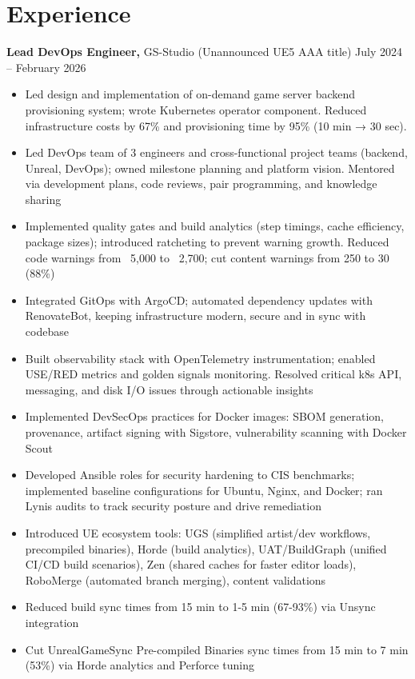 \documentclass[10.5pt]{article}
\begin{document}
\section*{Experience}
\textbf{Lead DevOps Engineer,} GS-Studio (Unannounced UE5 AAA title) \hfill July 2024 -- February 2026 \\
\vspace{-8pt}
\begin{itemize}
  \item Led design and implementation of on-demand game server backend provisioning system; wrote Kubernetes operator component. Reduced infrastructure costs by 67\% and provisioning time by 95\% (10 min → 30 sec).
  \item Led DevOps team of 3 engineers and cross-functional project teams (backend, Unreal, DevOps); owned milestone planning and platform vision. Mentored via development plans, code reviews, pair programming, and knowledge sharing
  \item Implemented quality gates and build analytics (step timings, cache efficiency, package sizes); introduced ratcheting to prevent warning growth. Reduced code warnings from ~5,000 to ~2,700; cut content warnings from 250 to 30 (88\%)
  \item Integrated GitOps with ArgoCD; automated dependency updates with RenovateBot, keeping infrastructure modern, secure and in sync with codebase
  \item Built observability stack with OpenTelemetry instrumentation; enabled USE/RED metrics and golden signals monitoring. Resolved critical k8s API, messaging, and disk I/O issues through actionable insights
  \item Implemented DevSecOps practices for Docker images: SBOM generation, provenance, artifact signing with Sigstore, vulnerability scanning with Docker Scout
  \item Developed Ansible roles for security hardening to CIS benchmarks; implemented baseline configurations for Ubuntu, Nginx, and Docker; ran Lynis audits to track security posture and drive remediation
  \item Introduced UE ecosystem tools: UGS (simplified artist/dev workflows, precompiled binaries), Horde (build analytics), UAT/BuildGraph (unified CI/CD build scenarios), Zen (shared caches for faster editor loads), RoboMerge (automated branch merging), content validations
  \item Reduced build sync times from 15 min to 1-5 min (67-93\%) via Unsync integration
  \item Cut UnrealGameSync Pre-compiled Binaries sync times from 15 min to 7 min (53\%) via Horde analytics and Perforce tuning
\end{itemize}
\end{document}
